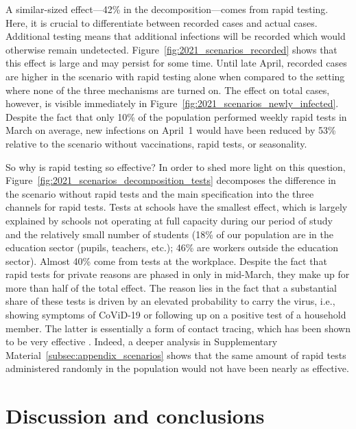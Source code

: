 A similar-sized effect---42\% in the decomposition---comes from rapid testing. Here, it
is crucial to differentiate between recorded cases and actual cases. Additional testing
means that additional infections will be recorded which would otherwise remain
undetected. Figure~\ref{fig:2021_scenarios_recorded} shows that this effect is large and
may persist for some time. Until late April, recorded cases are higher in the scenario
with rapid testing alone when compared to the setting where none of the three mechanisms
are turned on. The effect on total cases, however, is visible immediately in
Figure~\ref{fig:2021_scenarios_newly_infected}. Despite the fact that only 10\% of the
population performed weekly rapid tests in March on average, new infections on April~1
would have been reduced by 53\% relative to the scenario without vaccinations, rapid
tests, or seasonality.

So why is rapid testing so effective? In order to shed more light on this question,
Figure~\ref{fig:2021_scenarios_decomposition_tests} decomposes the difference in the
scenario without rapid tests and the main specification into the three channels for
rapid tests. Tests at schools have the smallest effect, which is largely explained by
schools not operating at full capacity during our period of study and the relatively
small number of students (18\% of our population are in the education sector (pupils,
teachers, etc.); 46\% are workers outside the education sector). Almost 40\% come from
tests at the workplace. Despite the fact that rapid tests for private reasons are phased
in only in mid-March, they make up for more than half of the total effect. The reason
lies in the fact that a substantial share of these tests is driven by an elevated
probability to carry the virus, i.e., showing symptoms of CoViD-19 or following up on a
positive test of a household member. The latter is essentially a form of contact
tracing, which has been shown to be very effective \citep{Contreras2021,
Fetzer2021,Kretzschmar2020}. Indeed, a deeper analysis in Supplementary
Material~\ref{subsec:appendix_scenarios} shows that the same amount of rapid tests
administered randomly in the population would not have been nearly as effective.


\section{Discussion and conclusions}


